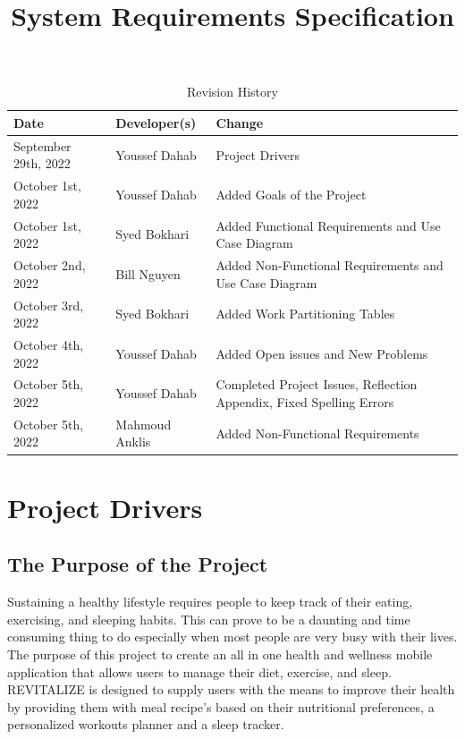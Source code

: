 \documentclass[12pt,letterpaper]{article}
\title{System Requirements Specification\\\progname}
\author{\authname}
\date{}
\begin{document}
\maketitle

\begin{table}[hp]
\caption{Revision History} \label{TblRevisionHistory}
\begin{tabularx}{\textwidth}{llX}
	\toprule
	\textbf{Date} & \textbf{Developer(s)} & \textbf{Change}\\
	\midrule
	September 29th, 2022 & Youssef Dahab & Project Drivers \\
	October 1st, 2022 & Youssef Dahab & Added Goals of the Project \\
	October 1st, 2022 & Syed Bokhari & Added Functional Requirements and Use Case Diagram \\
	October 2nd, 2022 & Bill Nguyen & Added Non-Functional Requirements and Use Case Diagram \\
	October 3rd, 2022 & Syed Bokhari & Added Work Partitioning Tables \\
	October 4th, 2022 & Youssef Dahab & Added Open issues and New Problems \\
	October 5th, 2022 & Youssef Dahab & Completed Project Issues, Reflection Appendix, Fixed Spelling Errors\\
	October 5th, 2022 & Mahmoud Anklis & Added Non-Functional Requirements\\
	\bottomrule
\end{tabularx}
\end{table}

\newpage
\tableofcontents
\newpage

\section{Project Drivers}

\subsection{The Purpose of the Project}
Sustaining a healthy lifestyle requires people to keep track of their eating, exercising, and sleeping habits. This can prove to be a daunting and time consuming thing to do especially when most people are very busy with their lives. The purpose of this project to create an all in one health and wellness mobile application that allows users to manage their diet, exercise, and sleep. REVITALIZE is designed to supply users with the means to improve their health by providing them with meal recipe's based on their nutritional preferences, a personalized workouts planner and a sleep tracker. 
\end{document}
